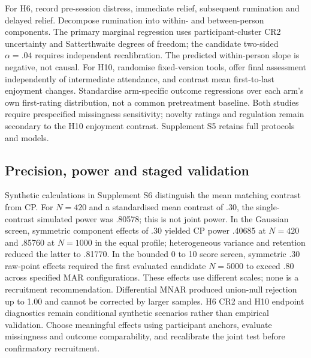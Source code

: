 \documentclass[11pt,a4paper]{article}
\begin{document}
For H6, record pre-session distress, immediate relief, subsequent rumination and delayed relief. Decompose rumination into within- and between-person components. The primary marginal regression uses participant-cluster CR2 uncertainty and Satterthwaite degrees of freedom; the candidate two-sided $\alpha=.04$ requires independent recalibration. The predicted within-person slope is negative, not causal. For H10, randomise fixed-version tools, offer final assessment independently of intermediate attendance, and contrast mean first-to-last enjoyment changes. Standardise arm-specific outcome regressions over each arm's own first-rating distribution, not a common pretreatment baseline. Both studies require prespecified missingness sensitivity; novelty ratings and regulation remain secondary to the H10 enjoyment contrast. Supplement S5 retains full protocols and models.

\subsection{Precision, power and staged validation}
Synthetic calculations in Supplement S6 distinguish the mean matching contrast from CP. For $N=420$ and a standardised mean contrast of .30, the single-contrast simulated power was .80578; this is not joint power. In the Gaussian screen, symmetric component effects of .30 yielded CP power .40685 at $N=420$ and .85760 at $N=1000$ in the equal profile; heterogeneous variance and retention reduced the latter to .81770. In the bounded 0 to 10 score screen, symmetric .30 raw-point effects required the first evaluated candidate $N=5000$ to exceed .80 across specified MAR configurations. These effects use different scales; none is a recruitment recommendation. Differential MNAR produced union-null rejection up to 1.00 and cannot be corrected by larger samples. H6 CR2 and H10 endpoint diagnostics remain conditional synthetic scenarios rather than empirical validation. Choose meaningful effects using participant anchors, evaluate missingness and outcome comparability, and recalibrate the joint test before confirmatory recruitment.
\end{document}
